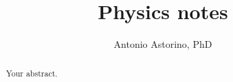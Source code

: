 \documentclass{report}
\title{Physics notes}
\author{Antonio Astorino, PhD}
\begin{document}
\maketitle

\begin{abstract}
Your abstract.
\end{abstract}



\end{document}
